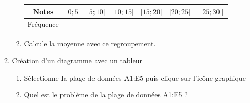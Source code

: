 \begin{enumerate}
\begin{enumerate}
\begin{enumerate}
\begin{tabular}{|c|c|c|c|c|c|c|}
\hline 
Notes & $[0;5[$ &  $[5;10[$  &  $[10;15[$  &  $[15;20[$  &  $[20;25[$  &  $[25;30]$  \\ 
\hline 
Fréquence &  &  &  &  &  &  \\ 
\hline 
\end{tabular} 

\item Calcule la moyenne avec ce regroupement.	
\end{enumerate}
\item Création d'un diagramme avec un tableur
\begin{enumerate}
\item  Sélectionne la plage de données A1:E5 puis clique sur l'icône graphique
\item  Quel est le problème de la plage de données A1:E5 ?
\end{enumerate}

\end{enumerate}
\end{enumerate}



